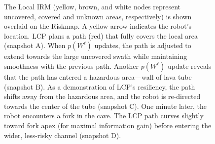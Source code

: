 \documentclass[letterpaper]{article} %
\begin{document}
\begin{figure}[h!]
\centering
\caption{The Local IRM (yellow, brown, and white nodes represent uncovered, covered and unknown areas, respectively) is shown overlaid on the Riskmap. A yellow arrow indicates the robot's location. LCP plans a path (red) that fully covers the local area (snapshot A). When $p(W^\ell)$ updates, the path is adjusted to extend towards the large uncovered swath while maintaining smoothness with the previous path. Another $p(W^\ell)$ update reveals that the path has entered a hazardous area---wall of lava tube (snapshot B). As a demonstration of LCP's resiliency, the path shifts away from the hazardous area, and the robot is re-directed towards the center of the tube (snapshot C). One minute later, the robot encounters a fork in the cave. The LCP path curves slightly toward fork apex (for maximal information gain) before entering the wider, less-risky channel (snapshot D). } 
\label{fig:mlp_hardware_tests} 
\end{figure}
\end{document}
